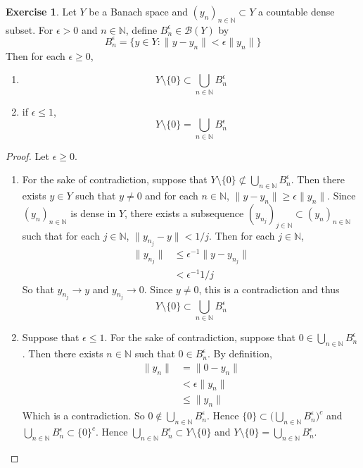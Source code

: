 \documentclass{book}
\theoremstyle{definition}
\newtheorem{ex}[definition]{Exercise}
\newcommand{\ep}{\epsilon}
\newcommand{\N}{\mathbb{N}}
\newcommand{\MB}{\mathcal{B}}
\newcommand{\lex}[1]{\label{ex:#1}}
\DeclareMathOperator*{\0}{\mbf{0}}
\DeclareMathOperator*{\1}{\mbf{1}}
\begin{document}
	\begin{ex} \lex{00000} 
	Let $Y$ be a Banach space and $(y_n)_{n \in \N} \subset Y$ a countable dense subset. For $\ep >0$ and $n \in \N$, define $B^{\ep}_n \in \MB(Y)$ by 
	$$B^{\ep}_n = \{y \in Y: \|y - y_n\| < \ep \| y_n \| \}$$ 
	Then for each $\ep \geq 0$, 
	\begin{enumerate}
		\item $$Y \setminus \{ 0 \} \subset \bigcup\limits_{n \in \N}B^{\ep}_n$$
		\item if $\ep \leq 1$, $$Y \setminus \{ 0 \} = \bigcup\limits_{n \in \N}B^{\ep}_n$$
	\end{enumerate}
	\end{ex}	
	
	\begin{proof}
	Let $\ep \geq 0$. 
	\begin{enumerate}
		\item For the sake of contradiction, suppose that $Y\setminus \{ 0 \} \not \subset \bigcup\limits_{n \in \N}B^{\ep}_n$. Then there exists $y \in Y$ such that $y \neq 0$ and for each $n \in \N$, $\|y- y_n\| \geq \ep \|y_n\|$. Since $(y_n)_{n \in \N}$ is dense in $Y$, there exists a subsequence $(y_{n_j})_{j \in \N} \subset (y_n)_{n \in \N}$ such that for each $j \in \N$, $\|y_{n_j} - y\| < 1/j$. Then for each $j \in \N$,
		\begin{align*}
			\|y_{n_j}\| 
			& \leq  \ep^{-1}\|y- y_{n_j}\| \\
			& < \ep^{-1}1/j
		\end{align*}
		So that $y_{n_j} \rightarrow y$ and $y_{n_j} \rightarrow 0$. Since $y \neq 0$, this is a contradiction and thus $$Y \setminus \{ 0 \} \subset \bigcup\limits_{n \in \N}B^{\ep}_n$$ 
		\item Suppose that $\ep \leq 1$. For the sake of contradiction, suppose that $0 \in \bigcup\limits_{n \in \N}B^{\ep}_n $. Then there exists $n \in \N$ such that $0 \in B^{\ep}_n$.  By definition, 
		\begin{align*}
			\|y_n\| 
			& = \|0 - y_n\| \\
			& < \ep \|y_n\| \\
			& \leq \|y_n\|
		\end{align*}
		Which is a contradiction. So $0 \not \in  \bigcup\limits_{n \in \N}B^{\ep}_n$. Hence $\{0\} \subset \bigg( \bigcup\limits_{n \in \N}B^{\ep}_n \bigg)^c$ and $ \bigcup\limits_{n \in \N}B^{\ep}_n \subset \{0\}^c$. Hence $ \bigcup\limits_{n \in \N}B^{\ep}_n \subset Y \setminus \{0\}$ and $Y \setminus \{ 0 \} = \bigcup\limits_{n \in \N}B^{\ep}_n$.
	\end{enumerate}
	\end{proof}
\end{document}
